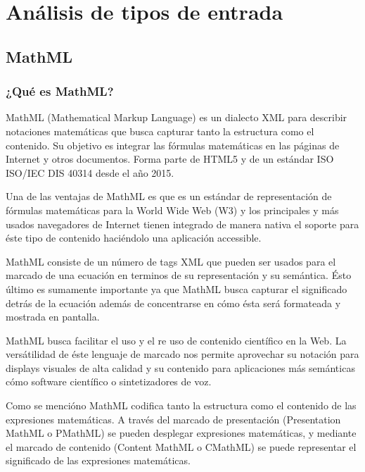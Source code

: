 
\chapter{Análisis de tipos de entrada}

\label{Chapter2} %


\section{MathML}


\subsection{¿Qué es MathML?}

MathML (Mathematical Markup Language) es un dialecto XML para describir notaciones matemáticas que busca capturar tanto la estructura
como el contenido. Su objetivo es integrar las fórmulas matemáticas en las páginas de Internet y otros documentos.
Forma parte de HTML5 y de un estándar ISO ISO/IEC DIS 40314 desde el año 2015. %

Una de las ventajas de MathML es que es un estándar de representación de fórmulas matemáticas para la World Wide Web (W3) y los principales y más usados
navegadores de Internet tienen integrado de manera nativa el soporte para éste tipo de contenido haciéndolo una aplicación accessible.

MathML consiste de un número de tags XML que pueden ser usados
para el marcado de una ecuación en terminos de su representación y su semántica. Ésto último es sumamente importante
ya que MathML busca capturar el significado detrás de la ecuación además de concentrarse en cómo ésta será formateada y mostrada en pantalla. 

MathML busca facilitar el uso y el re uso de contenido científico en la Web. La versátilidad de éste lenguaje de marcado nos permite aprovechar
su notación para displays visuales de alta calidad y su contenido para aplicaciones más semánticas cómo software científico o sintetizadores de voz.

Como se mencióno MathML codifica tanto la estructura como el contenido de las expresiones matemáticas.
A través del marcado de presentación (Presentation MathML o PMathML) se pueden desplegar expresiones matemáticas, y mediante el marcado de contenido
(Content MathML o CMathML) se puede representar el significado de las expresiones matemáticas.

